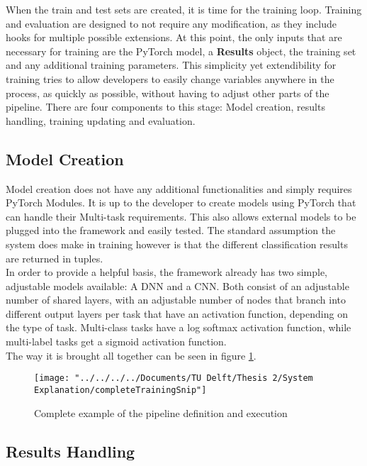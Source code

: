 When the train and test sets are created, it is time for the training loop. Training and evaluation are designed to not require any modification, as they include hooks for multiple possible extensions. At this point, the only inputs that are necessary for training are the PyTorch model, a \textbf{Results} object, the training set and any additional training parameters. This simplicity yet extendibility for training tries to allow developers to easily change variables anywhere in the process, as quickly as possible, without having to adjust other parts of the pipeline. There are four components to this stage: Model creation, results handling, training updating and evaluation. \\

\subsection{Model Creation} \label{Impl:Training:Model}

Model creation does not have any additional functionalities and simply requires PyTorch Modules. It is up to the developer to create models using PyTorch that can handle their Multi-task requirements. This also allows external models to be plugged into the framework and easily tested. The standard assumption the system does make in training however is that the different classification results are returned in tuples. \\

In order to provide a helpful basis, the framework already has two simple, adjustable models available: A DNN and a CNN. Both consist of an adjustable number of shared layers, with an adjustable number of nodes that branch into different output layers per task that have an activation function, depending on the type of task. Multi-class tasks have a log softmax activation function, while multi-label tasks get a sigmoid activation function. \\ 

The way it is brought all together can be seen in figure \ref{fig:completetrainingsnip}.

\begin{figure}
	\centering
	\texttt{[image: "../../../../Documents/TU Delft/Thesis 2/System Explanation/completeTrainingSnip"]}
	\caption{Complete example of the pipeline definition and execution}
	\label{fig:completetrainingsnip}
\end{figure}

\subsection{Results Handling} \label{Impl:Training:Results}

